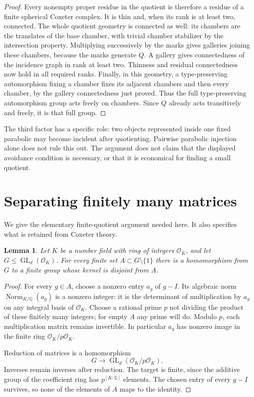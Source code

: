 \documentclass[11pt,a4paper]{article}
\newtheorem{lemma}[theorem]{Lemma}
\begin{document}
\begin{proof}
Every nonempty proper residue in the quotient is therefore a residue
of a finite spherical Coxeter complex. It is thin and, when its rank
is at least two, connected. The whole quotient geometry is connected
as well: its chambers are the translates of the base chamber, with
trivial chamber stabilizer by the intersection property. Multiplying
successively by the marks gives galleries joining these chambers,
because the marks generate $Q$. A gallery gives connectedness of
the incidence graph in rank at least two. Thinness and residual
connectedness now hold in all required ranks. Finally, in this geometry, a type-preserving automorphism fixing a
chamber fixes its adjacent chambers and then every chamber, by the
gallery connectedness just proved. Thus the full
type-preserving automorphism group acts freely on chambers. Since
$Q$ already acts transitively and freely, it is that full group.
\end{proof}

The third factor has a specific role: two objects represented inside
one fixed parabolic may become incident after quotienting. Pairwise
parabolic injection alone does not rule this out. The argument does
not claim that the displayed avoidance condition is necessary, or
that it is economical for finding a small quotient.

\section{Separating finitely many matrices}

We give the elementary finite-quotient argument needed here. It also
specifies what is retained from Coxeter theory.

\begin{lemma}\label{matrices}
Let $K$ be a number field with ring of integers $\mathcal O_K$,
and let $G\le\operatorname{GL}_d(\mathcal O_K)$. For every finite
set $A\subset G\setminus\{1\}$ there is a homomorphism from $G$
to a finite group whose kernel is disjoint from $A$.
\end{lemma}

\begin{proof}
For every $g\in A$, choose a nonzero entry $a_g$ of $g-I$.
Its algebraic norm $\operatorname{Norm}_{K/\mathbb Q}(a_g)$ is a
nonzero integer: it is the determinant of multiplication by $a_g$
on any integral basis of $\mathcal O_K$. Choose a rational prime
$p$ not dividing the product of these finitely many integers; for
empty $A$ any prime will do. Modulo $p$, each multiplication
matrix remains invertible. In particular $a_g$ has nonzero image
in the finite ring $\mathcal O_K/p\mathcal O_K$.

Reduction of matrices is a homomorphism
\[
 G\longrightarrow
 \operatorname{GL}_d(\mathcal O_K/p\mathcal O_K).
\]
Inverses remain inverses after reduction. The target is finite,
since the additive group of the coefficient ring has
$p^{[K:\mathbb Q]}$ elements. The chosen entry of every $g-I$
survives, so none of the elements of $A$ maps to the identity.
\end{proof}
\end{document}
